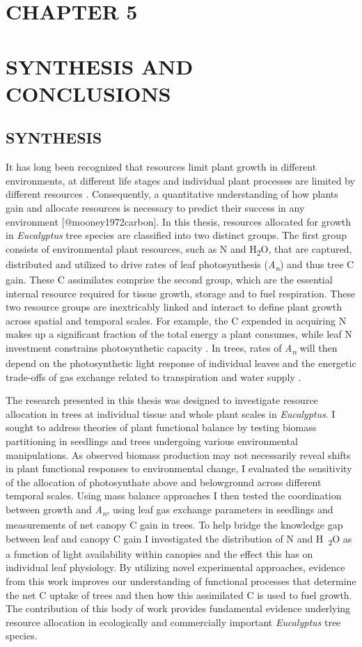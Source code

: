 \documentclass[a4paper]{article}
\begin{document}
\section*{CHAPTER 5 \\ \mbox{ }\\ SYNTHESIS AND CONCLUSIONS}
\subsection*{SYNTHESIS}
It has long been recognized that resources limit plant growth in different environments, at different life stages and individual plant processes are limited by different resources \citep{bazzaz2000reproductive}. Consequently, a quantitative understanding of how plants gain and allocate resources is necessary to predict their success in any environment [@mooney1972carbon]. In this thesis, resources allocated for growth in \textit{Eucalyptus} tree species are classified into two distinct groups. The first group consists of environmental plant resources, such as N and H\textsubscript{2}O, that are captured, distributed and utilized to drive rates of leaf photosynthesis (\textit{A\textsubscript{n}}) and thus tree C gain. These C assimilates comprise the second group, which are the essential internal resource required for tissue growth, storage and to fuel respiration. These two resource groups are inextricably linked and interact to define plant growth across spatial and temporal scales. For example, the C expended in acquiring N makes up a significant fraction of the total energy a plant consumes, while leaf N investment constrains photosynthetic capacity \citep{chapin1987plant}. In trees, rates of \textit{A\textsubscript{n}} will then depend on the photosynthetic light response of individual leaves and the energetic trade-offs of gas exchange related to transpiration and water supply \citep{givnish1988adaptation}.

The research presented in this thesis was designed to investigate resource allocation in trees at individual tissue and whole plant scales in \textit{Eucalyptus}. I sought to address theories of plant functional balance by testing biomass partitioning in seedlings and trees undergoing various environmental manipulations. As observed biomass production may not necessarily reveal shifts in plant functional responses to environmental change, I evaluated the sensitivity of the allocation of photosynthate above and belowground across different temporal scales. Using mass balance approaches I then tested the coordination between growth and \textit{A\textsubscript{n}}, using leaf gas exchange parameters in seedlings and measurements of net canopy C gain in trees. To help bridge the knowledge gap between leaf and canopy C gain I investigated the distribution of N and H~\textsubscript{2}O as a function of light availability within canopies and the effect this has on individual leaf physiology. By utilizing novel experimental approaches, evidence from this work improves our understanding of functional processes that determine the net C uptake of trees and then how this assimilated C is used to fuel growth. The contribution of this body of work provides fundamental evidence underlying resource allocation in ecologically and commercially important \textit{Eucalyptus} tree species.
\end{document}
